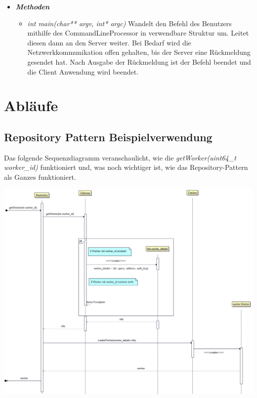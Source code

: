 \documentclass[a4paper,12pt]{article}
\begin{document}
\begin{itemize}[label={}]

	\item \textit{\textbf{Methoden}}
		\begin{itemize}[label={\textbullet}]

			\item \textit{int main(char** argv, int* argc)} Wandelt den Befehl des Benutzers mithilfe des CommandLineProcessor in verwendbare Struktur um. Leitet diesen dann an den Server weiter. Bei Bedarf wird die Netzwerkkommunikation offen gehalten, bis der Server eine Rückmeldung gesendet hat. Nach Ausgabe der Rückmeldung ist der Befehl beendet und die Client Anwendung wird beendet.
			
		\end{itemize}

\end{itemize}


\section{Abläufe}
\subsection{Repository Pattern Beispielverwendung}

Das folgende Sequenzdiagramm veranschaulicht, wie die \textit{getWorker(uint64\_t worker\_id)} funktioniert und, was noch wichtiger ist, wie das Repository-Pattern als Ganzes funktioniert.

\includegraphics[width=\textwidth]{repository_sequence_diagram}
\end{document}
